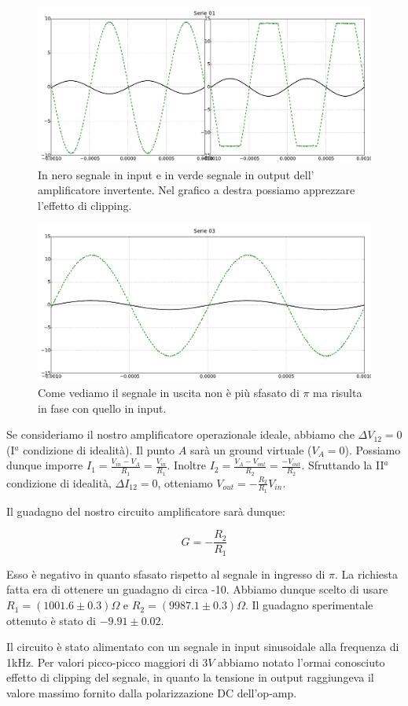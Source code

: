 \begin{figure}
			\includegraphics[width=.45\textwidth]{serie_01_ampl.pdf}
			\caption{In nero segnale in input e in verde segnale in output dell' amplificatore invertente. Nel grafico a destra possiamo apprezzare l'effetto di clipping.}
			\label{fig:inv}
\end{figure}
\begin{figure}
			\includegraphics[width=.45\textwidth]{serie_03_ampl.pdf}
			\caption{Come vediamo il segnale in uscita non è più sfasato di $\pi$ ma risulta in fase con quello in input.}
			\label{fig:inv}
\end{figure}

Se consideriamo il nostro amplificatore operazionale ideale, abbiamo che $\Delta V_{12}=0$ (I$^a$ condizione di idealità).
Il punto $A$ sarà un ground virtuale ($V_A = 0$).
Possiamo dunque imporre $I_1=\frac{V_{in}-V_A}{R_1}=\frac{V_{in}}{R_1}$.
Inoltre $I_2=\frac{V_A-V_{out}}{R_2}=\frac{-V_{out}}{R_2}$.
Sfruttando la II$^a$ condizione di idealità, $\Delta I_{12}=0$, otteniamo $V_{out}=-\frac{R_2}{R_1} V_{in}$.





Il guadagno del nostro circuito amplificatore sarà dunque:

\begin{equation}
G=-\frac{R_2}{R_1}
\end{equation}




Esso è negativo in quanto sfasato rispetto al segnale in ingresso di $\pi$.
La richiesta fatta era di ottenere un guadagno di circa -10.
Abbiamo dunque scelto di usare $R_1=(1001.6\pm0.3)\Omega$ e $R_2=(9987.1\pm0.3)\Omega$.
Il guadagno sperimentale ottenuto è stato di $-9.91 \pm 0.02$.

Il circuito è stato alimentato con un segnale in input sinusoidale alla frequenza di 1kHz.
Per valori picco-picco maggiori di $3V$ abbiamo notato l'ormai conosciuto effetto di clipping del segnale, in quanto la tensione in output raggiungeva il valore massimo fornito dalla polarizzazione DC dell'op-amp. 




